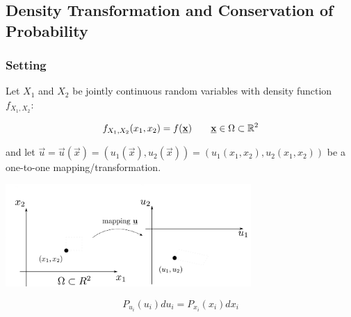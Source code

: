 \subsection{Density Transformation and Conservation of Probability}

\begin{frame}
\slidesonly{
\begin{center}
	\huge \subsecname
\end{center}
}
\end{frame}

\subsubsection{Setting}

\begin{frame}%

Let $X_1$ and $X_2$ be jointly continuous random variables with 
density function $f_{X_1, X_2}$:

\svspace{-3mm}

\begin{equation}
f_{X_1, X_2}(x_1, x_2) = f(\underline{\mathbf{x}}) \qquad \underline{\mathbf{x}} \in \Omega \subset \mathbb{R}^2
\end{equation}

\pause

and let $\vec u = \vec u(\vec x) = ( u_1(\vec x), u_2(\vec x)) = ( u_1(x_1, x_2), u_2(x_1, x_2)) $ be a one-to-one mapping/transformation.

\svspace{-3mm}

\begin{center}
\includegraphics[width=0.7\textwidth]{img/xu_mapping}
\end{center}

\svspace{-3mm}


\pause


\svspace{-3mm}

\begin{equation}
P_{u_i}({u}_i) d {u}_i 
= P_{x_i} ({x}_i) d {x}_i
\end{equation}

\end{frame}

